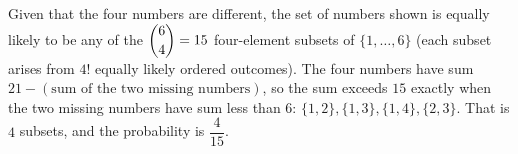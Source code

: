 Given that the four numbers are different, the set of numbers shown is equally likely to be any of the $\dbinom64=15$ four-element subsets of $\{1,\dots,6\}$ (each subset arises from $4!$ equally likely ordered outcomes). The four numbers have sum $21-(\text{sum of the two missing numbers})$, so the sum exceeds $15$ exactly when the two missing numbers have sum less than $6$: $\{1,2\},\{1,3\},\{1,4\},\{2,3\}$. That is $4$ subsets, and the probability is $\boxed{\dfrac{4}{15}}$.
